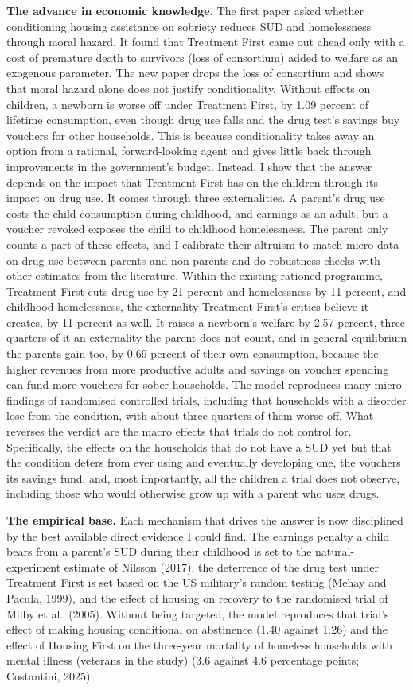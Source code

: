 \documentclass[10pt]{article}
\begin{document}
\textbf{The advance in economic knowledge.} The first paper asked whether conditioning housing assistance on sobriety reduces SUD and homelessness through moral hazard. It found that Treatment First came out ahead only with a cost of premature death to survivors (loss of consortium) added to welfare as an exogenous parameter. The new paper drops the loss of consortium and shows that moral hazard alone does not justify conditionality. Without effects on children, a newborn is worse off under Treatment First, by 1.09 percent of lifetime consumption, even though drug use falls and the drug test's savings buy vouchers for other households. This is because conditionality takes away an option from a rational, forward-looking agent and gives little back through improvements in the government's budget. Instead, I show that the answer depends on the impact that Treatment First has on the children through its impact on drug use. It comes through three externalities. A parent's drug use costs the child consumption during childhood, and earnings as an adult, but a voucher revoked exposes the child to childhood homelessness. The parent only counts a part of these effects, and I calibrate their altruism to match micro data on drug use between parents and non-parents and do robustness checks with other estimates from the literature. Within the existing rationed programme, Treatment First cuts drug use by 21 percent and homelessness by 11 percent, and childhood homelessness, the externality Treatment First's critics believe it creates, by 11 percent as well. It raises a newborn's welfare by 2.57 percent, three quarters of it an externality the parent does not count, and in general equilibrium the parents gain too, by 0.69 percent of their own consumption, because the higher revenues from more productive adults and savings on voucher spending can fund more vouchers for sober households. The model reproduces many micro findings of randomised controlled trials, including that households with a disorder lose from the condition, with about three quarters of them worse off. What reverses the verdict are the macro effects that trials do not control for. Specifically, the effects on the households that do not have a SUD yet but that the condition deters from ever using and eventually developing one, the vouchers its savings fund, and, most importantly, all the children a trial does not observe, including those who would otherwise grow up with a parent who uses drugs.

\textbf{The empirical base.} Each mechanism that drives the answer is now disciplined by the best available direct evidence I could find. The earnings penalty a child bears from a parent's SUD during their childhood is set to the natural-experiment estimate of Nilsson (2017), the deterrence of the drug test under Treatment First is set based on the US military's random testing (Mehay and Pacula, 1999), and the effect of housing on recovery to the randomised trial of Milby et al.\ (2005). Without being targeted, the model reproduces that trial's effect of making housing conditional on abstinence (1.40 against 1.26) and the effect of Housing First on the three-year mortality of homeless households with mental illness (veterans in the study) (3.6 against 4.6 percentage points; Costantini, 2025).
\end{document}
